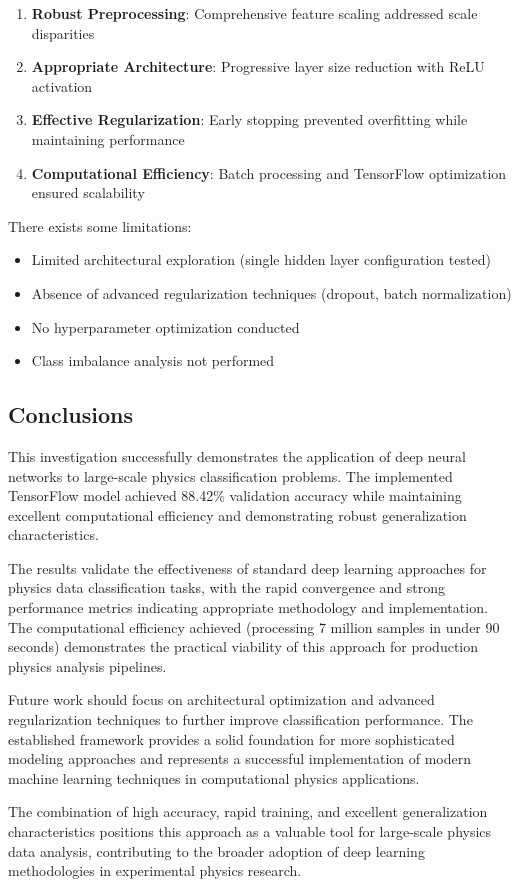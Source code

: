 \documentclass[12pt,a4paper]{article}
\begin{document}
\begin{enumerate}
    \item \textbf{Robust Preprocessing}: Comprehensive feature scaling addressed scale disparities
    \item \textbf{Appropriate Architecture}: Progressive layer size reduction with ReLU activation
    \item \textbf{Effective Regularization}: Early stopping prevented overfitting while maintaining performance
    \item \textbf{Computational Efficiency}: Batch processing and TensorFlow optimization ensured scalability
\end{enumerate}

There exists some limitations:

\begin{itemize}
    \item Limited architectural exploration (single hidden layer configuration tested)
    \item Absence of advanced regularization techniques (dropout, batch normalization)
    \item No hyperparameter optimization conducted
    \item Class imbalance analysis not performed
\end{itemize}

\subsection{Conclusions}

This investigation successfully demonstrates the application of deep neural networks to large-scale physics classification problems. The implemented TensorFlow model achieved 88.42\% validation accuracy while maintaining excellent computational efficiency and demonstrating robust generalization characteristics.

The results validate the effectiveness of standard deep learning approaches for physics data classification tasks, with the rapid convergence and strong performance metrics indicating appropriate methodology and implementation. The computational efficiency achieved (processing 7 million samples in under 90 seconds) demonstrates the practical viability of this approach for production physics analysis pipelines.

Future work should focus on architectural optimization and advanced regularization techniques to further improve classification performance. The established framework provides a solid foundation for more sophisticated modeling approaches and represents a successful implementation of modern machine learning techniques in computational physics applications.

The combination of high accuracy, rapid training, and excellent generalization characteristics positions this approach as a valuable tool for large-scale physics data analysis, contributing to the broader adoption of deep learning methodologies in experimental physics research.
\end{document}
